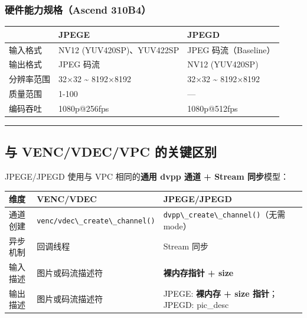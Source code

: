 \subsubsection{硬件能力规格（Ascend
310B4）}\label{src-book-chapter6-h117}

\begin{longtable}[]{@{}lll@{}}
\toprule\noalign{}
& JPEGE & JPEGD \\
\midrule\noalign{}
\endhead
\bottomrule\noalign{}
\endlastfoot
输入格式 & NV12 (YUV420SP)、YUV422SP & JPEG 码流（Baseline） \\
输出格式 & JPEG 码流 & NV12 (YUV420SP) \\
分辨率范围 & 32×32 \textasciitilde{} 8192×8192 & 32×32 \textasciitilde{}
8192×8192 \\
质量范围 & 1-100 & --- \\
编码吞吐 & 1080p@256fps & 1080p@512fps \\
\end{longtable}

\begin{center}\rule{0.5\linewidth}{0.5pt}\end{center}

\subsection{与 VENC/VDEC/VPC 的关键区别}\label{src-book-chapter6-h118}

JPEGE/JPEGD 使用与 VPC 相同的\textbf{通用 dvpp 通道 + Stream 同步}模型：

\begin{longtable}[]{@{}
  >{\raggedright\arraybackslash}p{}
  >{\raggedright\arraybackslash}p{}
  >{\raggedright\arraybackslash}p{}@{}}
\toprule\noalign{}
\begin{minipage}[b]{\linewidth}\raggedright
维度
\end{minipage} & \begin{minipage}[b]{\linewidth}\raggedright
VENC/VDEC
\end{minipage} & \begin{minipage}[b]{\linewidth}\raggedright
JPEGE/JPEGD
\end{minipage} \\
\midrule\noalign{}
\endhead
\bottomrule\noalign{}
\endlastfoot
通道创建 & \passthrough{\lstinline!venc/vdec\_create\_channel()!} &
\passthrough{\lstinline!dvpp\_create\_channel()!}（无需 mode） \\
异步机制 & 回调线程 & Stream 同步 \\
输入描述 & 图片或码流描述符 & \textbf{裸内存指针 + size} \\
输出描述 & 图片或码流描述符 & JPEGE: \textbf{裸内存 + size 指针}；JPEGD:
pic\_desc \\
\end{longtable}

